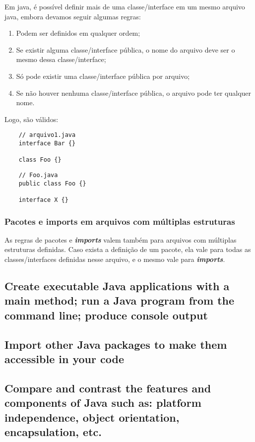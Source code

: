 \documentclass[12pt]{article}
\begin{document}
Em java, é possível definir mais de uma classe/interface em um mesmo arquivo java, embora devamos seguir algumas regras:

\begin{enumerate}
	\item Podem ser definidos em qualquer ordem;
	\item Se existir alguma classe/interface pública, o nome do arquivo deve ser o mesmo dessa classe/interface;
	\item Só pode existir uma classe/interface pública por arquivo;
	\item Se não houver nenhuma classe/interface pública, o arquivo pode ter qualquer nome.
\end{enumerate}

Logo, são válidos:

\begin{lstlisting}
	// arquivo1.java
	interface Bar {}
	
	class Foo {}
\end{lstlisting}


\begin{lstlisting}
	// Foo.java
	public class Foo {}
	
	interface X {}
\end{lstlisting}

\subsubsection{Pacotes e imports em arquivos com múltiplas estruturas}

As regras de pacotes e \textbf{\textit{imports}} valem também para arquivos com múltiplas estruturas definidas. Caso exista a definição de um pacote, ela vale para todas as classes/interfaces definidas nesse arquivo, e o mesmo vale para \textbf{\textit{imports}}.

\subsection*{Create executable Java applications with a main method; run a Java program from the command line; produce console output}





\newpage

\subsection*{Import other Java packages to make them accessible in your code}
\subsection*{Compare and contrast the features and components of Java such as: platform independence, object orientation, encapsulation, etc.}

	
\end{document}
